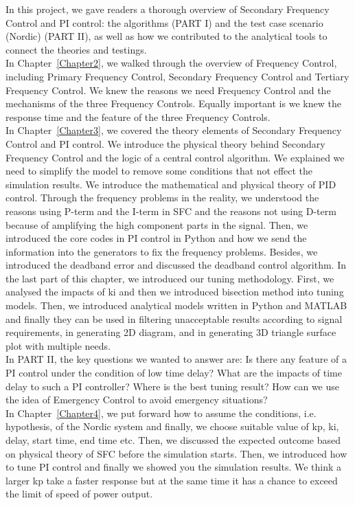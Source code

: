 In this project, we gave readers a thorough overview of Secondary Frequency Control and PI control: the algorithms (PART I) and the test case scenario (Nordic) (PART II), as well as how we contributed to the analytical tools to connect the theories and testings.\\

In Chapter~\ref{Chapter2}, we walked through the overview of Frequency Control, including Primary Frequency Control, Secondary Frequency Control and Tertiary Frequency Control. We knew the reasons we need Frequency Control and the mechanisms of the three Frequency Controls. Equally important is we knew the response time and the feature of the three Frequency Controls.\\

In Chapter~\ref{Chapter3}, we covered the theory elements of Secondary Frequency Control and PI control. We introduce the physical theory behind Secondary Frequency Control and the logic of a central control algorithm. We explained we need to simplify the model to remove some conditions that not effect the simulation results. We introduce the mathematical and physical theory of PID control. Through the frequency problems in the reality, we understood the reasons using P-term and the I-term in SFC and the reasons not using D-term because of amplifying the high component parts in the signal. Then, we introduced the core codes in PI control in Python and how we send the information into the generators to fix the frequency problems. Besides, we introduced the deadband error and discussed the deadband control algorithm. In the last part of this chapter, we introduced our tuning methodology. First, we analysed the impacts of ki and then we introduced bisection method into tuning models. Then, we introduced analytical models written in Python and MATLAB and finally they can be used in filtering unacceptable results according to signal requirements, in generating 2D diagram, and in generating 3D triangle surface plot with multiple needs.\\

In PART II, the key questions we wanted to answer are: Is there any feature of a PI control under the condition of low time delay? What are the impacts of time delay to such a PI controller? Where is the best tuning result? How can we use the idea of Emergency Control to avoid emergency situations?\\

In Chapter~\ref{Chapter4}, we put forward how to assume the conditions, i.e. hypothesis, of the Nordic system and finally, we choose suitable value of kp, ki, delay, start time, end time etc. Then, we discussed the expected outcome based on physical theory of SFC before the simulation starts. Then, we introduced how to tune PI control and finally we showed you the simulation results. We think a larger kp take a faster response but at the same time it has a chance to exceed the limit of speed of power output.\\

